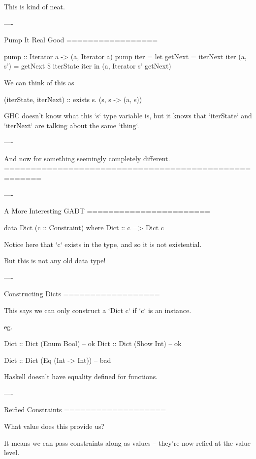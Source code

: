 This is kind of neat.

----

Pump It Real Good
=================

\begin{hs}
  pump :: Iterator a -> (a, Iterator a)
  pump iter = let getNext = iterNext iter
                  (a, s') = getNext \$ iterState iter
               in (a, Iterator s' getNext)
\end{hs}

We can think of this as

\begin{hs}
  (iterState, iterNext) :: exists s. (s, s -> (a, s))
\end{hs}

GHC doesn't know what this `s` type variable is, but it knows that `iterState` and `iterNext` are talking about the same
`thing`.

----

And now for something seemingly completely different.
=====================================================

----

A More Interesting GADT
=======================

\begin{hs}
  data Dict (c :: Constraint) where
    Dict :: c => Dict c
\end{hs}

Notice here that `c` exists in the type, and so it is not existential.

But this is not any old data type!

----

Constructing Dicts
==================

This says we can only construct a `Dict c` if `c` is an instance.

eg.

\begin{hs}
  Dict :: Dict (Enum Bool)        -- ok
  Dict :: Dict (Show Int)         -- ok

  Dict :: Dict (Eq (Int -> Int))  -- bad
\end{hs}

Haskell doesn't have equality defined for functions.

----

Reified Constraints
===================

What value does this provide us?

It means we can pass constraints along as values -- they're now refied at the value level.

